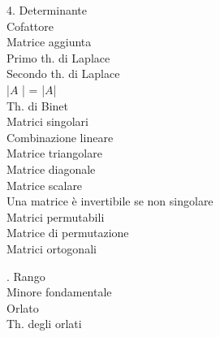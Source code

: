 \documentclass[11pt,a4paper]{article}
\newcommand{\pagina}[1]{\clearpage}
\begin{document}
\begin{flushleft}
4. Determinante\\
\textbullet{}     Cofattore\\
\textbullet{}     Matrice aggiunta\\
\textbullet{}     Primo th. di Laplace\\
\textbullet{}     Secondo th. di Laplace\\
\textbullet{}     |$A$ | = |$A$|\\
\textbullet{}     Th. di Binet\\
\textbullet{}     Matrici singolari\\
\textbullet{}     Combinazione lineare\\
\textbullet{}     Matrice triangolare\\
\textbullet{}     Matrice diagonale\\
\textbullet{}     Matrice scalare\\
\textbullet{}     Una matrice è invertibile se non singolare\\
\textbullet{}     Matrici permutabili\\
\textbullet{}     Matrice di permutazione\\
\textbullet{}     Matrici ortogonali\\
\par{}. Rango\\
\textbullet{}     Minore fondamentale\\
\textbullet{}     Orlato\\
\textbullet{}     Th. degli orlati\\
\end{flushleft}
\pagina{2}
\end{document}
